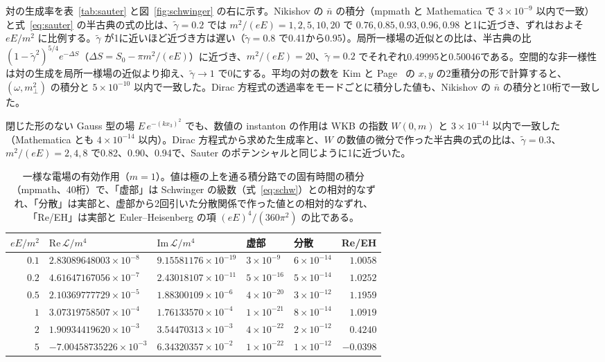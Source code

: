 \documentclass[a4paper,10pt]{ltjsarticle}
\begin{document}
対の生成率を表~\ref{tab:sauter} と図~\ref{fig:schwinger} の右に示す。Nikishov の $\bar n$ の積分（mpmath と Mathematica で $3\times10^{-9}$ 以内で一致）と式~\eqref{eq:sauter} の半古典の式の比は、$\tilde\gamma=0.2$ では $m^2/(eE)=1,2,5,10,20$ で $0.76,0.85,0.93,0.96,0.98$ と1に近づき、ずれはおよそ $eE/m^2$ に比例する。$\tilde\gamma$ が1に近いほど近づき方は遅い（$\tilde\gamma=0.8$ で0.41から0.95）。局所一様場の近似との比は、半古典の比 $(1-\tilde\gamma^2)^{5/4}e^{-\Delta S}$（$\Delta S=S_0-\pi m^2/(eE)$）に近づき、$m^2/(eE)=20$、$\tilde\gamma=0.2$ でそれぞれ0.49995と0.50046である。空間的な非一様性は対の生成を局所一様場の近似より抑え、$\tilde\gamma\to1$ で0にする。平均の対の数を Kim と Page~\cite{kp06} の $x,y$ の2重積分の形で計算すると、$(\omega,m_\perp^2)$ の積分と $5\times10^{-10}$ 以内で一致した。Dirac 方程式の透過率をモードごとに積分した値も、Nikishov の $\bar n$ の積分と10桁で一致した。

閉じた形のない Gauss 型の場 $E\,e^{-(kx_3)^2}$ でも、数値の instanton の作用は WKB の指数 $W(0,m)$ と $3\times10^{-14}$ 以内で一致した（Mathematica とも $4\times10^{-14}$ 以内）。Dirac 方程式から求めた生成率と、$W$ の数値の微分で作った半古典の式の比は、$\tilde\gamma=0.3$、$m^2/(eE)=2,4,8$ で0.82、0.90、0.94で、Sauter のポテンシャルと同じように1に近づいた。

\begin{table}[tbp]
\centering\small
\caption{一様な電場の有効作用（$m=1$）。値は極の上を通る積分路での固有時間の積分（mpmath、40桁）で、「虚部」は Schwinger の級数（式~\eqref{eq:schw}）との相対的なずれ、「分散」は実部と、虚部から2回引いた分散関係で作った値との相対的なずれ、「Re/EH」は実部と Euler--Heisenberg の項 $(eE)^4/(360\pi^2)$ の比である。}
\label{tab:schw}
\footnotesize\setlength{\tabcolsep}{5pt}
\begin{tabular}{rllllr}
\toprule
$eE/m^2$ & $\mathrm{Re}\,\mathcal L/m^4$ & $\mathrm{Im}\,\mathcal L/m^4$ & 虚部 & 分散 & Re/EH \\
\midrule
$0.1$ & $2.83089648003\times10^{-8}$ & $9.15581176\times10^{-19}$ & $3\times10^{-9}$ & $6\times10^{-14}$ & $1.0058$ \\
$0.2$ & $4.61647167056\times10^{-7}$ & $2.43018107\times10^{-11}$ & $5\times10^{-16}$ & $5\times10^{-14}$ & $1.0252$ \\
$0.5$ & $2.10369777729\times10^{-5}$ & $1.88300109\times10^{-6}$ & $4\times10^{-20}$ & $3\times10^{-12}$ & $1.1959$ \\
$1$ & $3.07319758507\times10^{-4}$ & $1.76133570\times10^{-4}$ & $1\times10^{-21}$ & $8\times10^{-14}$ & $1.0919$ \\
$2$ & $1.90934419620\times10^{-3}$ & $3.54470313\times10^{-3}$ & $4\times10^{-22}$ & $2\times10^{-12}$ & $0.4240$ \\
$5$ & $-7.00458735226\times10^{-3}$ & $6.34320357\times10^{-2}$ & $1\times10^{-22}$ & $1\times10^{-12}$ & $-0.0398$ \\
\bottomrule
\end{tabular}
\end{table}
\end{document}

